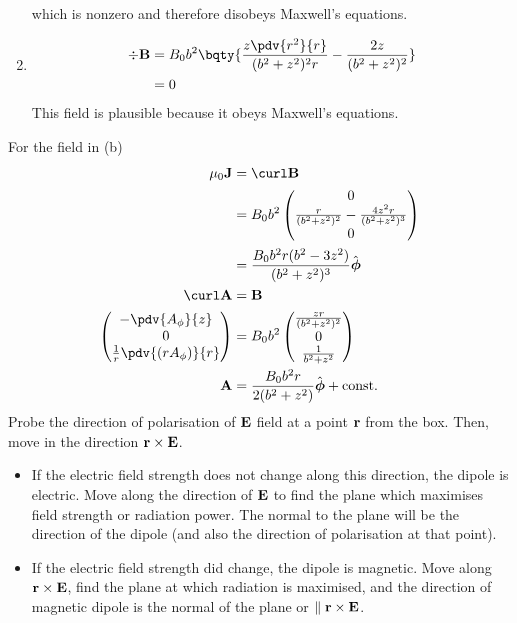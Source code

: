 \documentclass[12pt]{extarticle}
\begin{document}
\begin{outline}
\begin{enumerate}
        which is nonzero and therefore disobeys Maxwell's equations.
        \item {\eqhold \begin{align*}
            \div \bf B &= 
            B_0b^2\bqty{\frac{z \pdv{r^2}{r}}{(b^2 + z^2)^2r} - \frac{2z}{(b^2 + z^2)^2}}\\
            &= 0
        \end{align*}}
        This field is plausible because it obeys Maxwell's equations.
        \end{enumerate}
        For the field in (b) \begin{align*}
            \mu_0 \bf J &= \curl \bf B\\
            &= B_0b^2\begin{pmatrix} 0\\ \frac{r}{(b^2 + z^2)^2} - \frac{4z^2r}{(b^2 + z^2)^3} \\ 0\end{pmatrix} \\
            &= \frac{B_0b^2r(b^2 - 3z^2)}{(b^2 + z^2)^3} \hat{\boldsymbol{\phi}}\\
            \curl \bf A &=  \bf B \\
            \begin{pmatrix} -\pdv{A_\phi}{z}\\0\\\frac{1}{r}\pdv{(rA_\phi)}{r} \end{pmatrix} &= B_0b^2 \begin{pmatrix} \frac{zr}{(b^2 + z^2)^2}\\0\\\frac{1}{b^2 + z^2} \end{pmatrix} \\
            \bf A &= \frac{B_0b^2r}{2(b^2 + z^2)} \hat{\boldsymbol\phi} + \text{const.}
        \end{align*}
        \1 Probe the direction of polarisation of \(\bf E\) field at a point \(\bf r\) from the box. Then, move in the direction \(\bf r \times \bf E\). 
        \begin{itemize}
            \item If the electric field strength does not change along this direction, the dipole is electric. Move along the direction of \(\bf E\) to find the plane which maximises field strength or radiation power. The normal to the plane will be the direction of the dipole (and also the direction of polarisation at that point).
            \item If the electric field strength did change, the dipole is magnetic. Move along \(\bf r \times \bf E\), find the plane at which radiation is maximised, and the direction of magnetic dipole is the normal of the plane or \(\parallel \bf r \times \bf E\).

\end{itemize}
\end{outline}
\end{document}
